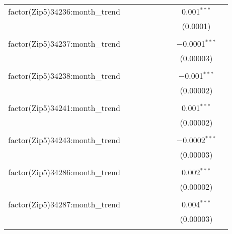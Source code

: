 \begin{table}[H]
{\begin{tabular}{@{\extracolsep{5pt}}lcccccccc}
  factor(Zip5)34236:month\_trend &  &  &  &  &  &  & 0.001$^{***}$ &  \\  

   &  &  &  &  &  &  & (0.0001) &  \\  

   & & & & & & & & \\  

  factor(Zip5)34237:month\_trend &  &  &  &  &  &  & $-$0.0001$^{***}$ &  \\  

   &  &  &  &  &  &  & (0.00003) &  \\  

   & & & & & & & & \\  

  factor(Zip5)34238:month\_trend &  &  &  &  &  &  & $-$0.001$^{***}$ &  \\  

   &  &  &  &  &  &  & (0.00002) &  \\  

   & & & & & & & & \\  

  factor(Zip5)34241:month\_trend &  &  &  &  &  &  & 0.001$^{***}$ &  \\  

   &  &  &  &  &  &  & (0.00002) &  \\  

   & & & & & & & & \\  

  factor(Zip5)34243:month\_trend &  &  &  &  &  &  & $-$0.0002$^{***}$ &  \\  

   &  &  &  &  &  &  & (0.00003) &  \\  

   & & & & & & & & \\  

  factor(Zip5)34286:month\_trend &  &  &  &  &  &  & 0.002$^{***}$ &  \\  

   &  &  &  &  &  &  & (0.00002) &  \\  

   & & & & & & & & \\  

  factor(Zip5)34287:month\_trend &  &  &  &  &  &  & 0.004$^{***}$ &  \\  

   &  &  &  &  &  &  & (0.00003) &  \\  

   & & & & & & & & \\  


\end{tabular}}
\end{table}
